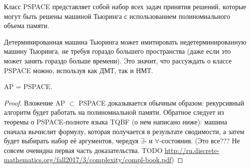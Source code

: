     \begin{Def}
        Класс PSPACE представляет собой набор всех задач принятия решений, которые могут быть решены машиной Тьюринга с использованием полиномиального объема памяти.
    \end{Def}
    \begin{Rem}
        Детерминированная машина Тьюринга может имитировать недетерминированную машину Тьюринга, не требуя гораздо большего пространства (даже если это может занять гораздо больше времени). Это значит, что рассуждать о классе PSPACE можно, используя как ДМТ, так и НМТ.
    \end{Rem}
    \begin{Thm}
        AP = PSPACE.
    \end{Thm}
    \begin{proof}
        Вложение AP $\subset$ PSPACE доказывается обычным образом: рекурсивный алгоритм будет работать на полиномиальной памяти. Обратное следует из теоремы о PSPACE-полноте языка TQBF (о нем написано ниже): машина сначала вычислит формулу, которая получается в результате сводимости, а затем будет выбирать набор её аргументов, чередуя $\exists$- и $\forall$-состояния.
        (Это все??? Не совсем очевидна первая часть доказательства. TODO \url{http://ru.discrete-mathematics.org/fall2017/3/complexity/compl-book.pdf})
    \end{proof} 


